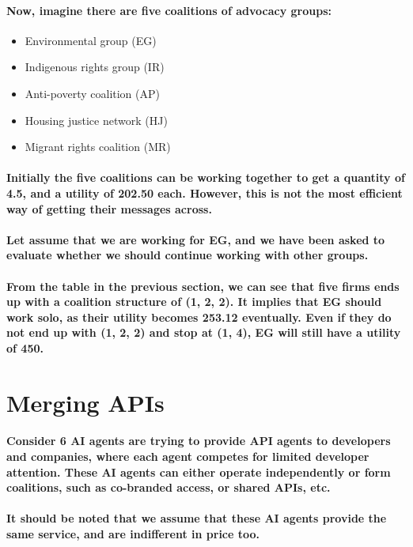 \documentclass[11pt]{report}
\begin{document}
\paragraph{Now, imagine there are five coalitions of advocacy groups: }
\begin{itemize}
	\item Environmental group (EG)
	\item Indigenous rights group (IR)
	\item Anti-poverty coalition (AP)
	\item Housing justice network (HJ)
	\item Migrant rights coalition (MR)
\end{itemize}
\paragraph{Initially the five coalitions can be working together to get a quantity of 4.5, and a utility of 202.50 each. However, this is not the most efficient way of getting their messages across. }
\paragraph{Let assume that we are working for EG, and we have been asked to evaluate whether we should continue working with other groups. }
\paragraph{From the table in the previous section, we can see that five firms ends up with a coalition structure of (1, 2, 2). It implies that EG should work solo, as their utility becomes 253.12 eventually. Even if they do not end up with (1, 2, 2) and stop at (1, 4), EG will still have a utility of 450.}

\section{Merging APIs}
\paragraph{Consider 6 AI agents are trying to provide API agents to developers and companies, where each agent competes for limited developer attention. These AI agents can either operate independently or form coalitions, such as co-branded access, or shared APIs, etc. }
\paragraph{It should be noted that we assume that these AI agents provide the same service, and are indifferent in price too. }
\end{document}
